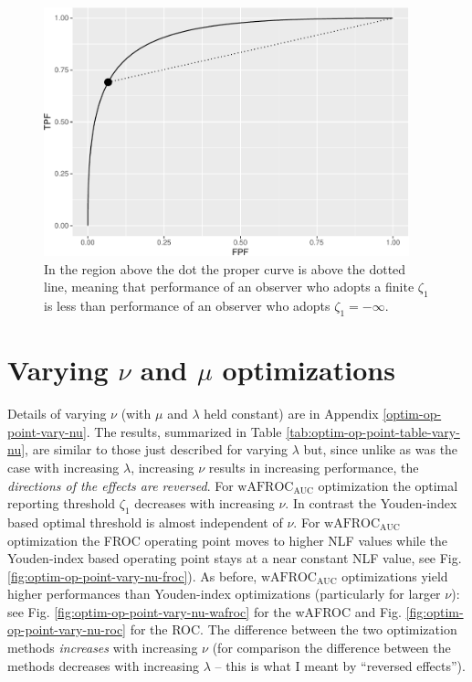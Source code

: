 \documentclass[
]{book}
\begin{document}
\begin{figure}

{\centering \includegraphics[width=300pt]{21-optim-op-point_files/figure-latex/binormal-model-threshold-dependence-2-1} 

}

\caption{In the region above the dot the proper curve is above the dotted line, meaning that performance of an observer who adopts a finite $\zeta_1$ is less than performance of an observer who adopts $\zeta_1 = -\infty$.}\label{fig:binormal-model-threshold-dependence-2}
\end{figure}

\hypertarget{optim-op-point-vary-nu-mu}{%
\section{\texorpdfstring{Varying \(\nu\) and \(\mu\) optimizations}{Varying \textbackslash nu and \textbackslash mu optimizations}}\label{optim-op-point-vary-nu-mu}}

Details of varying \(\nu\) (with \(\mu\) and \(\lambda\) held constant) are in Appendix \ref{optim-op-point-vary-nu}. The results, summarized in Table \ref{tab:optim-op-point-table-vary-nu}, are similar to those just described for varying \(\lambda\) but, since unlike as was the case with increasing \(\lambda\), increasing \(\nu\) results in increasing performance, the \emph{directions of the effects are reversed}. For \(\text{wAFROC}_\text{AUC}\) optimization the optimal reporting threshold \(\zeta_1\) decreases with increasing \(\nu\). In contrast the Youden-index based optimal threshold is almost independent of \(\nu\). For \(\text{wAFROC}_\text{AUC}\) optimization the FROC operating point moves to higher NLF values while the Youden-index based operating point stays at a near constant NLF value, see Fig. \ref{fig:optim-op-point-vary-nu-froc}). As before, \(\text{wAFROC}_\text{AUC}\) optimizations yield higher performances than Youden-index optimizations (particularly for larger \(\nu\)): see Fig. \ref{fig:optim-op-point-vary-nu-wafroc} for the wAFROC and Fig. \ref{fig:optim-op-point-vary-nu-roc} for the ROC. The difference between the two optimization methods \emph{increases} with increasing \(\nu\) (for comparison the difference between the methods decreases with increasing \(\lambda\) -- this is what I meant by ``reversed effects'').
\end{document}
